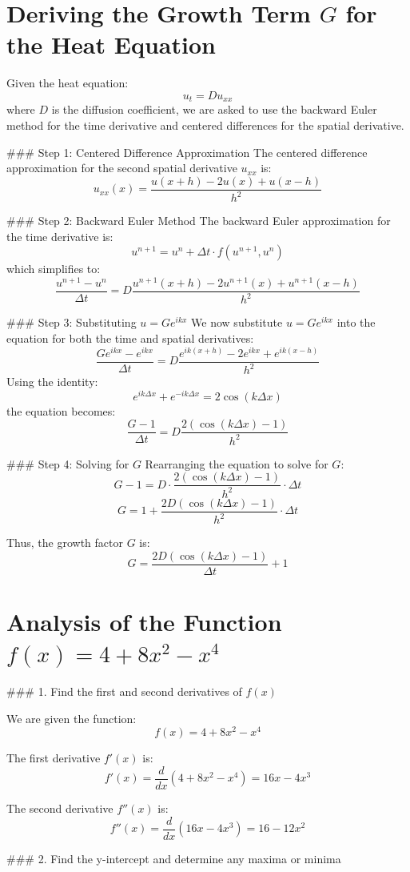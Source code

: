 \documentclass[11pt]{article}
\begin{document}
\section{Deriving the Growth Term \( G \) for the Heat Equation}

Given the heat equation:
\[
u_t = D u_{xx}
\]
where \( D \) is the diffusion coefficient, we are asked to use the backward Euler method for the time derivative and centered differences for the spatial derivative.

### Step 1: Centered Difference Approximation
The centered difference approximation for the second spatial derivative \( u_{xx} \) is:
\[
u_{xx}(x) = \frac{u(x+h) - 2u(x) + u(x-h)}{h^2}
\]

### Step 2: Backward Euler Method
The backward Euler approximation for the time derivative is:
\[
u^{n+1} = u^n + \Delta t \cdot f(u^{n+1}, u^n)
\]
which simplifies to:
\[
\frac{u^{n+1} - u^n}{\Delta t} = D \frac{u^{n+1}(x+h) - 2u^{n+1}(x) + u^{n+1}(x-h)}{h^2}
\]

### Step 3: Substituting \( u = G e^{ikx} \)
We now substitute \( u = G e^{ikx} \) into the equation for both the time and spatial derivatives:
\[
\frac{G e^{ikx} - e^{ikx}}{\Delta t} = D \frac{e^{ik(x+h)} - 2 e^{ikx} + e^{ik(x-h)}}{h^2}
\]
Using the identity:
\[
e^{ik\Delta x} + e^{-ik\Delta x} = 2 \cos(k\Delta x)
\]
the equation becomes:
\[
\frac{G - 1}{\Delta t} = D \frac{2 (\cos(k\Delta x) - 1)}{h^2}
\]

### Step 4: Solving for \( G \)
Rearranging the equation to solve for \( G \):
\[
G - 1 = D \cdot \frac{2 (\cos(k\Delta x) - 1)}{h^2} \cdot \Delta t
\]
\[
G = 1 + \frac{2D(\cos(k\Delta x) - 1)}{h^2} \cdot \Delta t
\]

Thus, the growth factor \( G \) is:
\[
\boxed{G = \frac{2D (\cos(k \Delta x) - 1)}{\Delta t} + 1}
\]
\section{Analysis of the Function \( f(x) = 4 + 8x^2 - x^4 \)}

### 1. Find the first and second derivatives of \( f(x) \)

We are given the function:
\[
f(x) = 4 + 8x^2 - x^4
\]

The first derivative \( f'(x) \) is:
\[
f'(x) = \frac{d}{dx}(4 + 8x^2 - x^4) = 16x - 4x^3
\]

The second derivative \( f''(x) \) is:
\[
f''(x) = \frac{d}{dx}(16x - 4x^3) = 16 - 12x^2
\]

### 2. Find the y-intercept and determine any maxima or minima
\end{document}
